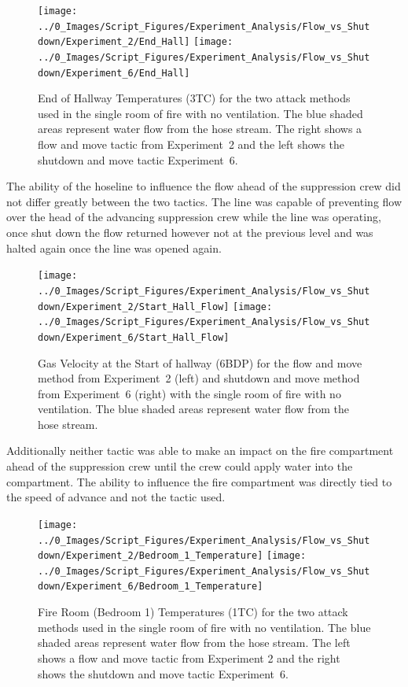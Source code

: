 \documentclass[12pt,oneside]{book}
\begin{document}
\begin{figure}[H]
\centering
\texttt{[image: ../0\_Images/Script\_Figures/Experiment\_Analysis/Flow\_vs\_Shutdown/Experiment\_2/End\_Hall]}
\texttt{[image: ../0\_Images/Script\_Figures/Experiment\_Analysis/Flow\_vs\_Shutdown/Experiment\_6/End\_Hall]}
\caption[Hall Temp. - No Vent - Flow \& Move vs. Shutdown \& Move]{End of Hallway Temperatures (3TC) for the two attack methods used in the single room of fire with no ventilation. The blue shaded areas represent water flow from the hose stream. The right shows a flow and move tactic from Experiment~2 and the left shows the shutdown and move tactic Experiment~6.}
\label{fig:Flow_vs_Shut_Single_No_Vent_TC}
\end{figure}

The ability of the hoseline to influence the flow ahead of the suppression crew did not differ greatly between the two tactics. The line was capable of preventing flow over the head of the advancing suppression crew while the line was operating, once shut down the flow returned however not at the previous level and was halted again once the line was opened again. 

\begin{figure}[H]
\centering
\texttt{[image: ../0\_Images/Script\_Figures/Experiment\_Analysis/Flow\_vs\_Shutdown/Experiment\_2/Start\_Hall\_Flow]}
\texttt{[image: ../0\_Images/Script\_Figures/Experiment\_Analysis/Flow\_vs\_Shutdown/Experiment\_6/Start\_Hall\_Flow]}
\caption[Airflow - Single Vent - Flow \& Move vs. Shutdown \& Move]{Gas Velocity at the Start of hallway (6BDP) for the flow and move method from Experiment~2 (left) and shutdown and move method from Experiment~6 (right) with the single room of fire with no ventilation. The blue shaded areas represent water flow from the hose stream.}
\label{fig:Flow_vs_Shut_Single_No_Vent_Velocity_TC}
\end{figure}

Additionally neither tactic was able to make an impact on the fire compartment ahead of the suppression crew until the crew could apply water into the compartment. The ability to influence the fire compartment was directly tied to the speed of advance and not the tactic used. 

\begin{figure}[H]
\centering
\texttt{[image: ../0\_Images/Script\_Figures/Experiment\_Analysis/Flow\_vs\_Shutdown/Experiment\_2/Bedroom\_1\_Temperature]}
\texttt{[image: ../0\_Images/Script\_Figures/Experiment\_Analysis/Flow\_vs\_Shutdown/Experiment\_6/Bedroom\_1\_Temperature]}
\caption[Bedroom 1 Temp. - Single Vent - Flow \& Move vs. Shutdown \& Move]{Fire Room (Bedroom 1) Temperatures (1TC) for the two attack methods used in the single room of fire with no ventilation. The blue shaded areas represent water flow from the hose stream. The left shows a flow and move tactic from Experiment 2 and the right shows the shutdown and move tactic Experiment~6.}
\label{fig:Flow_vs_Shut_Single_No_Vent_Fire_Temp_TC}
\end{figure}
\end{document}
